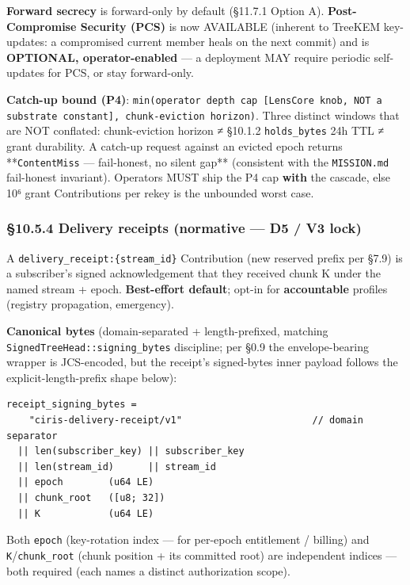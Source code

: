 \documentclass[10pt]{article}
\begin{document}
\textbf{Forward secrecy} is forward-only by default (§11.7.1 Option A). \textbf{Post-Compromise Security (PCS)} is now AVAILABLE (inherent to TreeKEM key-updates: a compromised current member heals on the next commit) and is \textbf{OPTIONAL, operator-enabled} — a deployment MAY require periodic self-updates for PCS, or stay forward-only.


\textbf{Catch-up bound (P4)}: \texttt{min(operator depth cap [LensCore knob, NOT a substrate constant], chunk-eviction horizon)}. Three distinct windows that are NOT conflated: chunk-eviction horizon ≠ §10.1.2 \texttt{holds\_bytes} 24h TTL ≠ grant durability. A catch-up request against an evicted epoch returns **\texttt{ContentMiss} — fail-honest, no silent gap** (consistent with the \texttt{MISSION.md} fail-honest invariant). Operators MUST ship the P4 cap \textbf{with} the cascade, else 10⁶ grant Contributions per rekey is the unbounded worst case.


\subsubsection*{§10.5.4 Delivery receipts (normative — D5 / V3 lock)}


A \texttt{delivery\_receipt:\{stream\_id\}} Contribution (new reserved prefix per §7.9) is a subscriber's signed acknowledgement that they received chunk K under the named stream + epoch. \textbf{Best-effort default}; opt-in for \textbf{accountable} profiles (registry propagation, emergency).


\textbf{Canonical bytes} (domain-separated + length-prefixed, matching \texttt{SignedTreeHead::signing\_bytes} discipline; per §0.9 the envelope-bearing wrapper is JCS-encoded, but the receipt's signed-bytes inner payload follows the explicit-length-prefix shape below):


\begin{lstlisting}
receipt_signing_bytes =
    "ciris-delivery-receipt/v1"                       // domain separator
  || len(subscriber_key) || subscriber_key
  || len(stream_id)      || stream_id
  || epoch        (u64 LE)
  || chunk_root   ([u8; 32])
  || K            (u64 LE)
\end{lstlisting}

Both \texttt{epoch} (key-rotation index — for per-epoch entitlement / billing) and \texttt{K}/\texttt{chunk\_root} (chunk position + its committed root) are independent indices — both required (each names a distinct authorization scope).
\end{document}
